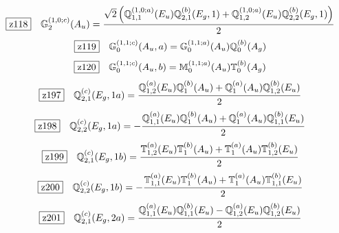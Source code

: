 \documentclass[fleqn,10pt,landscape]{jsarticle}
\begin{document}
\begin{dmath*}
\hspace*{3mm}\fbox{z118}\quad \mathbb{G}_{2}^{(1,0;c)}(A_{u})=\frac{\sqrt{2} \left(\mathbb{Q}_{1,1}^{(1,0;a)}(E_{u}) \mathbb{Q}_{2,1}^{(b)}(E_{g},1) + \mathbb{Q}_{1,2}^{(1,0;a)}(E_{u}) \mathbb{Q}_{2,2}^{(b)}(E_{g},1)\right)}{2}
\end{dmath*}
\begin{dmath*}
\hspace*{3mm}\fbox{z119}\quad \mathbb{G}_{0}^{(1,1;c)}(A_{u},a)=\mathbb{G}_{0}^{(1,1;a)}(A_{u}) \mathbb{Q}_{0}^{(b)}(A_{g})
\end{dmath*}
\begin{dmath*}
\hspace*{3mm}\fbox{z120}\quad \mathbb{G}_{0}^{(1,1;c)}(A_{u},b)=\mathbb{M}_{0}^{(1,1;a)}(A_{u}) \mathbb{T}_{0}^{(b)}(A_{g})
\end{dmath*}
\begin{dmath*}
\hspace*{3mm}\fbox{z197}\quad \mathbb{Q}_{2,1}^{(c)}(E_{g},1a)=\frac{\mathbb{Q}_{1,2}^{(a)}(E_{u}) \mathbb{Q}_{1}^{(b)}(A_{u}) + \mathbb{Q}_{1}^{(a)}(A_{u}) \mathbb{Q}_{1,2}^{(b)}(E_{u})}{2}
\end{dmath*}
\begin{dmath*}
\hspace*{3mm}\fbox{z198}\quad \mathbb{Q}_{2,2}^{(c)}(E_{g},1a)=- \frac{\mathbb{Q}_{1,1}^{(a)}(E_{u}) \mathbb{Q}_{1}^{(b)}(A_{u}) + \mathbb{Q}_{1}^{(a)}(A_{u}) \mathbb{Q}_{1,1}^{(b)}(E_{u})}{2}
\end{dmath*}
\begin{dmath*}
\hspace*{3mm}\fbox{z199}\quad \mathbb{Q}_{2,1}^{(c)}(E_{g},1b)=\frac{\mathbb{T}_{1,2}^{(a)}(E_{u}) \mathbb{T}_{1}^{(b)}(A_{u}) + \mathbb{T}_{1}^{(a)}(A_{u}) \mathbb{T}_{1,2}^{(b)}(E_{u})}{2}
\end{dmath*}
\begin{dmath*}
\hspace*{3mm}\fbox{z200}\quad \mathbb{Q}_{2,2}^{(c)}(E_{g},1b)=- \frac{\mathbb{T}_{1,1}^{(a)}(E_{u}) \mathbb{T}_{1}^{(b)}(A_{u}) + \mathbb{T}_{1}^{(a)}(A_{u}) \mathbb{T}_{1,1}^{(b)}(E_{u})}{2}
\end{dmath*}
\begin{dmath*}
\hspace*{3mm}\fbox{z201}\quad \mathbb{Q}_{2,1}^{(c)}(E_{g},2a)=\frac{\mathbb{Q}_{1,1}^{(a)}(E_{u}) \mathbb{Q}_{1,1}^{(b)}(E_{u}) - \mathbb{Q}_{1,2}^{(a)}(E_{u}) \mathbb{Q}_{1,2}^{(b)}(E_{u})}{2}
\end{dmath*}
\end{document}
